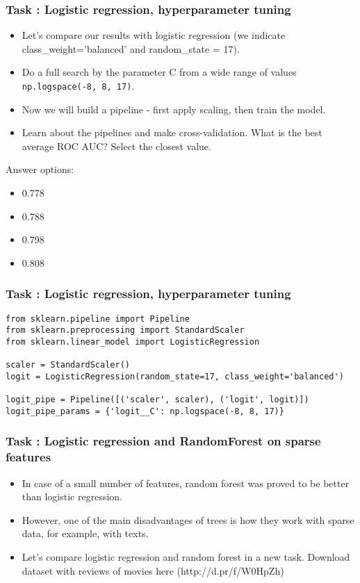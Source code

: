 \begin{frame}[fragile]\frametitle{Task : Logistic regression, hyperparameter tuning}
\begin{itemize}
\item Let's compare our results with logistic regression (we indicate class\_weight='balanced' and random\_state = 17). 
\item Do a full search by the parameter C from a wide range of values \lstinline|np.logspace(-8, 8, 17)|. 
\item Now we will build a pipeline - first apply scaling, then train the model.
\item 
Learn about the pipelines and make cross-validation. What is the best average ROC AUC? Select the closest value.
\end{itemize}

Answer options:

\begin{itemize}
\item 0.778
\item 0.788
\item 0.798
\item 0.808

\end{itemize}
\end{frame}

\begin{frame}[fragile]\frametitle{Task : Logistic regression, hyperparameter tuning}
\begin{lstlisting}
from sklearn.pipeline import Pipeline
from sklearn.preprocessing import StandardScaler
from sklearn.linear_model import LogisticRegression

scaler = StandardScaler()
logit = LogisticRegression(random_state=17, class_weight='balanced')

logit_pipe = Pipeline([('scaler', scaler), ('logit', logit)])
logit_pipe_params = {'logit__C': np.logspace(-8, 8, 17)}
\end{lstlisting}
\end{frame}


\begin{frame}[fragile]\frametitle{Task : Logistic regression and RandomForest on sparse features}
\begin{itemize}
\item In case of a small number of features, random forest was proved to be better than logistic regression. 
\item However, one of the main disadvantages of trees is how they work with sparse data, for example, with texts. 
\item Let's compare logistic regression and random forest in a new task. Download dataset with reviews of movies here (http://d.pr/f/W0HpZh)
\end{itemize}

\end{frame}

